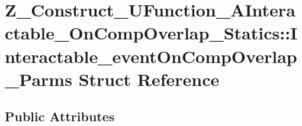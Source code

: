 \hypertarget{struct_z___construct___u_function___a_interactable___on_comp_overlap___statics_1_1_interactable__event_on_comp_overlap___parms}{}\section{Z\+\_\+\+Construct\+\_\+\+U\+Function\+\_\+\+A\+Interactable\+\_\+\+On\+Comp\+Overlap\+\_\+\+Statics\+::Interactable\+\_\+event\+On\+Comp\+Overlap\+\_\+\+Parms Struct Reference}
\label{struct_z___construct___u_function___a_interactable___on_comp_overlap___statics_1_1_interactable__event_on_comp_overlap___parms}
\subsection*{Public Attributes}
